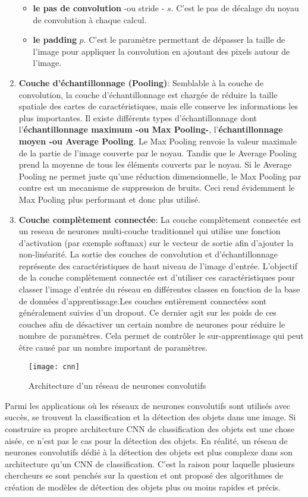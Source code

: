 \begin{enumerate}
\begin{itemize}
                    \item \textbf{le pas de convolution} -ou stride - $s$. C’est le pas de décalage du noyau de convolution à chaque calcul.
                    \item \textbf{le padding} $p$. C’est le paramètre permettant de dépasser la taille de l’image pour
                    appliquer la convolution en ajoutant des pixels autour de l’image.
                \end{itemize}
            \item \textbf{Couche d’échantillonnage (Pooling)}:
            Semblable à la couche de convolution, la couche d’échantillonnage est chargée de réduire la taille spatiale des cartes de caractéristiques, mais elle conserve les informations les plus importantes. Il existe différents types d’échantillonnage dont l’\textbf{échantillonnage maximum -ou Max Pooling-}, l’\textbf{échantillonnage moyen -ou Average Pooling}. Le Max Pooling renvoie la valeur maximale de la partie de l’image couverte par le noyau. Tandis que le Average Pooling prend la moyenne de tous les éléments couverts par le noyau. Si le Average Pooling ne permet juste qu'une réduction dimensionnelle, le Max Pooling par contre est un mecanisme de suppression de bruits. Ceci rend évidemment le Max Pooling plus performant et donc plus utilisé.
            \item \textbf{Couche complètement connectée}:
            La couche complètement connectée est un reseau de neurones multi-couche traditionnel qui utilise une fonction d’activation (par exemple softmax) sur le vecteur de sortie afin d’ajouter la non-linéarité. La sortie des couches de convolution et d’échantillonnage représente des caractéristiques de haut niveau de l’image d’entrée. L’objectif de la couche complètement connectée est d’utiliser ces caractéristiques pour classer l’image d’entrée du réseau en différentes classes en fonction de la base de données d’apprentissage.Les couches entièrement connectées sont généralement suivies d’un dropout. Ce dernier agit sur les poids de ces couches afin de désactiver un certain nombre de neurones pour réduire le nombre de paramètres. Cela permet de contrôler le sur-apprentissage qui peut être causé par un nombre important de paramètres.\cite{dahmaneThesis}
        \end{enumerate}
        \begin{figure}[H]
            \centering
            \texttt{[image: cnn]}
            \caption{Architecture d'un réseau de neurones convolutifs}
        \end{figure}
        Parmi les applications où les réseaux de neurones convolutifs sont utilisés avec succès, se trouvent la classification et la détection des objets dans une image. Si construire sa propre architecture CNN de classification des objets est une chose aisée, ce n’est pas le cas pour la détection des objets. En réalité, un réseau de neurones convolutifs dédié à la détection des objets est plus complexe dans son architecture qu’un CNN de classification. C’est la raison pour laquelle plusieurs chercheurs se sont penchés sur la question et ont proposé des algorithmes de création de modèles de détection des objets plus ou moins rapides et précis.
    
